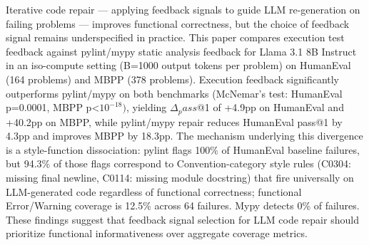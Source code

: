 
Iterative code repair --- applying feedback signals to guide LLM re-generation on failing problems --- improves functional correctness, but the choice of feedback signal remains underspecified in practice. This paper compares execution test feedback against pylint/mypy static analysis feedback for Llama 3.1 8B Instruct in an iso-compute setting (B=1000 output tokens per problem) on HumanEval (164 problems) and MBPP (378 problems). Execution feedback significantly outperforms pylint/mypy on both benchmarks (McNemar's test: HumanEval p=0.0001, MBPP p<$10^{-18})$, yielding $\Delta _pass$@1 of +4.9pp on HumanEval and +40.2pp on MBPP, while pylint/mypy repair reduces HumanEval pass@1 by 4.3pp and improves MBPP by 18.3pp. The mechanism underlying this divergence is a style-function dissociation: pylint flags 100\% of HumanEval baseline failures, but 94.3\% of those flags correspond to Convention-category style rules (C0304: missing final newline, C0114: missing module docstring) that fire universally on LLM-generated code regardless of functional correctness; functional Error/Warning coverage is 12.5\% across 64 failures. Mypy detects 0\% of failures. These findings suggest that feedback signal selection for LLM code repair should prioritize functional informativeness over aggregate coverage metrics.

